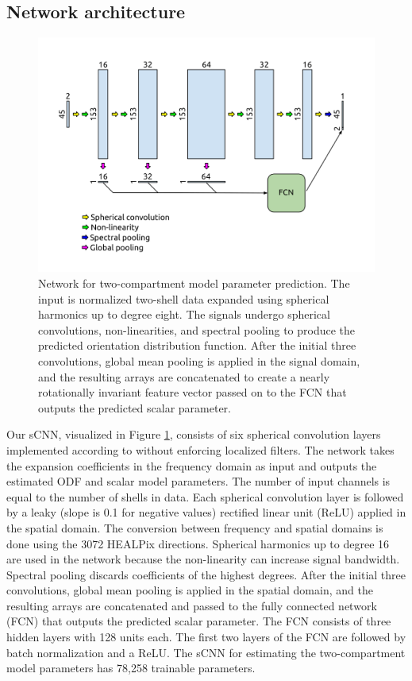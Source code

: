 \documentclass[10pt, letterpaper, oneside]{article}
\begin{document}
\subsection{Network architecture}

\begin{figure}
  \centering
  \includegraphics[width=.74\linewidth]{figures/network-architecture.png}
  \caption{Network for two-compartment model parameter prediction. The input is normalized two-shell data expanded using spherical harmonics up to degree eight. The signals undergo spherical convolutions, non-linearities, and spectral pooling to produce the predicted orientation distribution function. After the initial three convolutions, global mean pooling is applied in the signal domain, and the resulting arrays are concatenated to create a nearly rotationally invariant feature vector passed on to the FCN that outputs the predicted scalar parameter.}
  \label{fig:architecture}
\end{figure}

Our sCNN, visualized in Figure \ref{fig:architecture}, consists of six spherical convolution layers implemented according to \cite{esteves2018learning} without enforcing localized filters. The network takes the expansion coefficients in the frequency domain as input and outputs the estimated ODF and scalar model parameters. The number of input channels is equal to the number of shells in data. Each spherical convolution layer is followed by a leaky (slope is 0.1 for negative values) rectified linear unit (ReLU) applied in the spatial domain. The conversion between frequency and spatial domains is done using the 3072 HEALPix directions. Spherical harmonics up to degree 16 are used in the network because the non-linearity can increase signal bandwidth. Spectral pooling discards coefficients of the highest degrees. After the initial three convolutions, global mean pooling is applied in the spatial domain, and the resulting arrays are concatenated and passed to the fully connected network (FCN) that outputs the predicted scalar parameter. The FCN consists of three hidden layers with 128 units each. The first two layers of the FCN are followed by batch normalization \citep{ioffe2015batch} and a ReLU. The sCNN for estimating the two-compartment model parameters has 78,258 trainable parameters.
 
\end{document}
